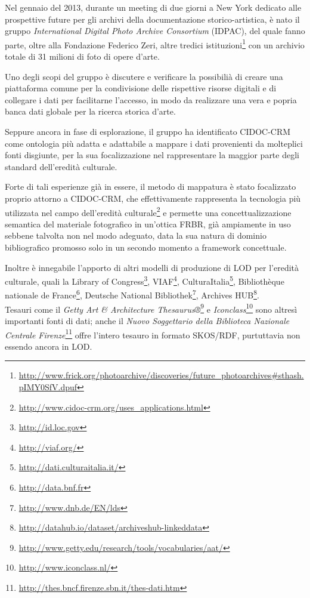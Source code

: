 Nel gennaio del 2013, durante un meeting di due giorni a New York dedicato alle prospettive future per gli archivi della documentazione storico-artistica, è nato il gruppo \emph{International Digital Photo Archive Consortium} (IDPAC), del quale fanno parte, oltre alla Fondazione Federico Zeri, altre tredici istituzioni\footnote{\url{http://www.frick.org/photoarchive/discoveries/future_photoarchives\#sthash.pIMY0SfV.dpuf}} con un archivio totale di 31 milioni di foto di opere d'arte.

Uno degli scopi del gruppo è discutere e verificare la possibilià di creare una piattaforma comune per la condivisione delle rispettive risorse digitali e di collegare i dati per facilitarne l'accesso, in modo da realizzare una vera e popria banca dati globale per la ricerca storica d'arte.

Seppure ancora in fase di esplorazione, il gruppo ha identificato CIDOC-CRM \cite{13} come ontologia più adatta e adattabile a mappare i dati provenienti da molteplici fonti disgiunte, per la sua focalizzazione nel rappresentare la maggior parte degli standard dell'eredità culturale.

Forte di tali esperienze già in essere, il metodo di mappatura è stato focalizzato proprio attorno a CIDOC-CRM, che effettivamente rappresenta la tecnologia più utilizzata nel campo dell'eredità culturale\footnote{\url{http://www.cidoc-crm.org/uses_applications.html}} e permette una concettualizzazione semantica del materiale fotografico in un'ottica FRBR, già ampiamente in uso sebbene talvolta non nel modo adeguato, data la sua natura di dominio bibliografico promosso solo in un secondo momento a framework concettuale.

Inoltre è innegabile l'apporto di altri modelli di produzione di LOD per l'eredità culturale, quali la Library of Congress\footnote{\url{http://id.loc.gov}}, VIAF\footnote{\url{http://viaf.org/}}, CulturaItalia\footnote{\url{http://dati.culturaitalia.it/}}, Bibliothèque nationale de France\footnote{\url{http://data.bnf.fr}}, Deutsche National Bibliothek\footnote{\url{http://www.dnb.de/EN/lds}}, Archives HUB\footnote{\url{http://datahub.io/dataset/archiveshub-linkeddata}}.\\
Tesauri come il \emph{Getty Art \& Architecture Thesaurus®}\footnote{\url{http://www.getty.edu/research/tools/vocabularies/aat/}} e \emph{Iconclass}\footnote{\url{http://www.iconclass.nl/}} sono altresì importanti fonti di dati; anche il \emph{Nuovo Soggettario della Biblioteca Nazionale Centrale Firenze}\footnote{\url{http://thes.bncf.firenze.sbn.it/thes-dati.htm}} offre l'intero tesauro in formato SKOS/RDF, purtuttavia non essendo ancora in LOD.

